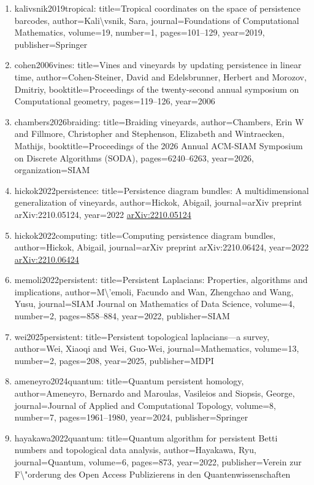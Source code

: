 \documentclass[11pt]{article}
\begin{document}
\begin{enumerate}[leftmargin=*]
  \item kalivsnik2019tropical: title=Tropical coordinates on the space of persistence barcodes, author=Kali\textbackslash{}vsnik, Sara, journal=Foundations of Computational Mathematics, volume=19, number=1, pages=101--129, year=2019, publisher=Springer
  \item cohen2006vines: title=Vines and vineyards by updating persistence in linear time, author=Cohen-Steiner, David and Edelsbrunner, Herbert and Morozov, Dmitriy, booktitle=Proceedings of the twenty-second annual symposium on Computational geometry, pages=119--126, year=2006
  \item chambers2026braiding: title=Braiding vineyards, author=Chambers, Erin W and Fillmore, Christopher and Stephenson, Elizabeth and Wintraecken, Mathijs, booktitle=Proceedings of the 2026 Annual ACM-SIAM Symposium on Discrete Algorithms (SODA), pages=6240--6263, year=2026, organization=SIAM
  \item hickok2022persistence: title=Persistence diagram bundles: A multidimensional generalization of vineyards, author=Hickok, Abigail, journal=arXiv preprint arXiv:2210.05124, year=2022 \href{https://arxiv.org/abs/2210.05124}{arXiv:2210.05124}
  \item hickok2022computing: title=Computing persistence diagram bundles, author=Hickok, Abigail, journal=arXiv preprint arXiv:2210.06424, year=2022 \href{https://arxiv.org/abs/2210.06424}{arXiv:2210.06424}
  \item memoli2022persistent: title=Persistent Laplacians: Properties, algorithms and implications, author=M\textbackslash{}'emoli, Facundo and Wan, Zhengchao and Wang, Yusu, journal=SIAM Journal on Mathematics of Data Science, volume=4, number=2, pages=858--884, year=2022, publisher=SIAM
  \item wei2025persistent: title=Persistent topological laplacians---a survey, author=Wei, Xiaoqi and Wei, Guo-Wei, journal=Mathematics, volume=13, number=2, pages=208, year=2025, publisher=MDPI
  \item ameneyro2024quantum: title=Quantum persistent homology, author=Ameneyro, Bernardo and Maroulas, Vasileios and Siopsis, George, journal=Journal of Applied and Computational Topology, volume=8, number=7, pages=1961--1980, year=2024, publisher=Springer
  \item hayakawa2022quantum: title=Quantum algorithm for persistent Betti numbers and topological data analysis, author=Hayakawa, Ryu, journal=Quantum, volume=6, pages=873, year=2022, publisher=Verein zur F\textbackslash{}"orderung des Open Access Publizierens in den Quantenwissenschaften

\end{enumerate}
\end{document}
